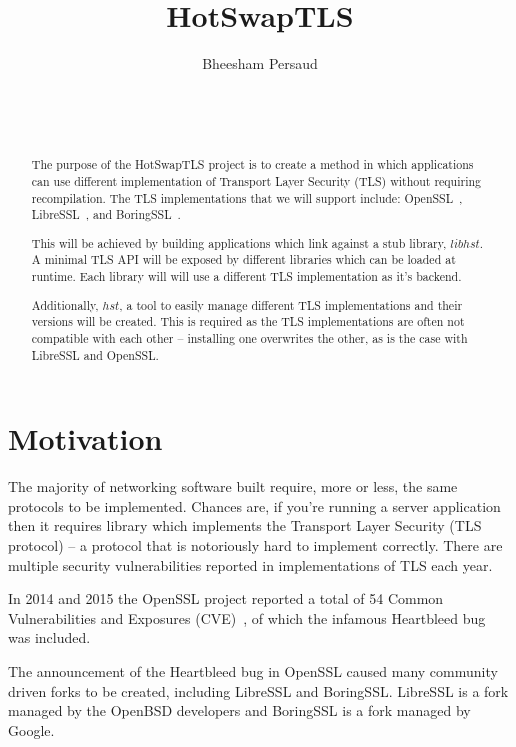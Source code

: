 \documentclass{acm_proc_article-sp}
\title{HotSwapTLS}
\author{
    \alignauthor
    Bheesham Persaud\\
        \affaddr{Carleton University}\\
        \affaddr{1125 Colonel By Drive}\\
        \affaddr{Ottawa, Ontario}\\
        \email{bheeshampersaud@cmail.carleton.ca}
}
\begin{document}
\maketitle

\begin{abstract}\label{sec:abstract}

The purpose of the HotSwapTLS project is to create a method in which
applications can use different implementation of Transport Layer Security (TLS)
without requiring recompilation. The TLS implementations that we will support
include: OpenSSL~\cite{openssl}, LibreSSL~\cite{libressl}, and
BoringSSL~\cite{boringssl}.

This will be achieved by building applications which link against a stub
library, $libhst$. A minimal TLS API will be exposed by different libraries
which can be loaded at runtime. Each library will will use a different TLS
implementation as it's backend.

Additionally, $hst$, a tool to easily manage different TLS implementations and
their versions will be created. This is required as the TLS implementations are
often not compatible with each other -- installing one overwrites the other, as
is the case with LibreSSL and OpenSSL.

\end{abstract}

\section{Motivation}\label{Sec:Motiv}

The majority of networking software built require, more or less, the same
protocols to be implemented. Chances are, if you're running a server application
then it requires library which implements the Transport Layer Security (TLS
protocol) -- a protocol that is notoriously hard to implement correctly. There
are multiple security vulnerabilities reported in implementations of TLS each
year.

In 2014 and 2015 the OpenSSL project reported a total of 54 Common
Vulnerabilities and Exposures (CVE)~\cite{opensslsec}, of which the infamous
Heartbleed bug was included.

The announcement of the Heartbleed bug in OpenSSL caused many community driven
forks to be created, including LibreSSL and BoringSSL. LibreSSL is a fork
managed by the OpenBSD developers and BoringSSL is a fork managed by Google.

\pagebreak
\end{document}
